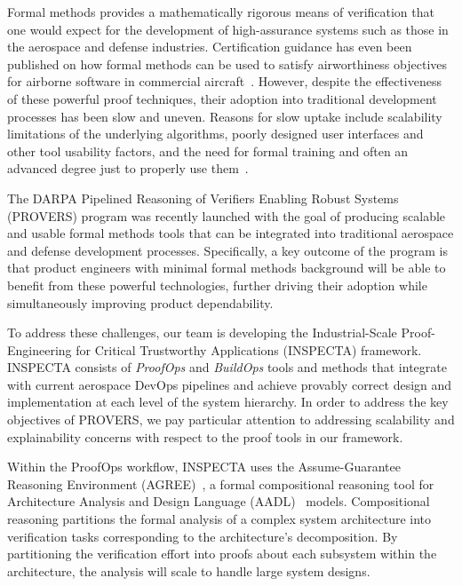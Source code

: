 Formal methods provides a mathematically rigorous means of verification that one would expect for the development of high-assurance systems such as those in the aerospace and defense industries. Certification guidance has even been published on how formal methods can be used to satisfy airworthiness objectives for airborne software in commercial aircraft~\cite{DO-333}.  However, despite the effectiveness of these powerful proof techniques, their adoption into traditional development processes has been slow and uneven.  Reasons for slow uptake include scalability limitations of the underlying algorithms, poorly designed user interfaces and other tool usability factors, and the need for formal training and often an advanced degree just to properly use them~\cite{?}.

The DARPA Pipelined Reasoning of Verifiers Enabling Robust Systems (PROVERS) program was recently launched with the goal of producing scalable and usable formal methods tools that can be integrated into traditional aerospace and defense development processes.  Specifically, a key outcome of the program is that product engineers with minimal formal methods background will be able to benefit from these powerful technologies, further driving their adoption while simultaneously improving product dependability.

To address these challenges, our team is developing the Industrial-Scale Proof-Engineering for Critical Trustworthy Applications (INSPECTA) framework.  INSPECTA consists of \textit{ProofOps} and \textit{BuildOps} tools and methods that integrate with current aerospace DevOps pipelines and achieve provably correct design and implementation at each level of the system hierarchy.  In order to address the key objectives of PROVERS, we pay particular attention to addressing scalability and explainability concerns with respect to the proof tools in our framework.

Within the ProofOps workflow, INSPECTA uses the Assume-Guarantee Reasoning Environment (AGREE)~\cite{compositional-analysis-agree}, a formal compositional reasoning tool for Architecture Analysis and Design Language (AADL)~\cite{feiler-aadl} models.
Compositional reasoning partitions the formal analysis of a complex system architecture into verification tasks corresponding to the architecture's decomposition.  By partitioning the verification effort into proofs about each subsystem within the architecture, the analysis will scale to handle large system designs.

